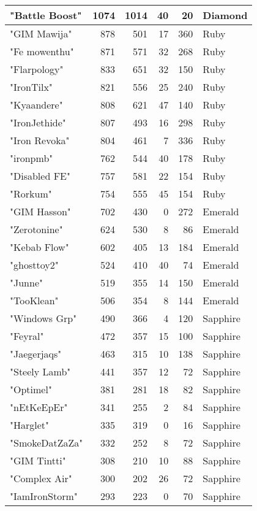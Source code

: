 \documentclass{article}
\begin{document}
\begin{table}[htbp]
\begin{tabular}{|l|r|r|r|r|l|}
"Battle Boost" & 1074 & 1014 & 40 & 20 & Diamond \\ \hline
"GIM Mawija" & 878 & 501 & 17 & 360 & Ruby \\ \hline
"Fe mowenthu" & 871 & 571 & 32 & 268 & Ruby \\ \hline
"Flarpology" & 833 & 651 & 32 & 150 & Ruby \\ \hline
"IronTilx" & 821 & 556 & 25 & 240 & Ruby \\ \hline
"Kyaandere" & 808 & 621 & 47 & 140 & Ruby \\ \hline
"IronJethide" & 807 & 493 & 16 & 298 & Ruby \\ \hline
"Iron Revoka" & 804 & 461 & 7 & 336 & Ruby \\ \hline
"ironpmb" & 762 & 544 & 40 & 178 & Ruby \\ \hline
"Disabled FE" & 757 & 581 & 22 & 154 & Ruby \\ \hline
"Rorkum" & 754 & 555 & 45 & 154 & Ruby \\ \hline
"GIM Hasson" & 702 & 430 & 0 & 272 & Emerald \\ \hline
"Zerotonine" & 624 & 530 & 8 & 86 & Emerald \\ \hline
"Kebab Flow" & 602 & 405 & 13 & 184 & Emerald \\ \hline
"ghosttoy2" & 524 & 410 & 40 & 74 & Emerald \\ \hline
"Junne" & 519 & 355 & 14 & 150 & Emerald \\ \hline
"TooKlean" & 506 & 354 & 8 & 144 & Emerald \\ \hline
"Windows Grp" & 490 & 366 & 4 & 120 & Sapphire \\ \hline
"Feyral" & 472 & 357 & 15 & 100 & Sapphire \\ \hline
"Jaegerjaqs" & 463 & 315 & 10 & 138 & Sapphire \\ \hline
"Steely Lamb" & 441 & 357 & 12 & 72 & Sapphire \\ \hline
"Optimel" & 381 & 281 & 18 & 82 & Sapphire \\ \hline
"nEtKeEpEr" & 341 & 255 & 2 & 84 & Sapphire \\ \hline
"Harglet" & 335 & 319 & 0 & 16 & Sapphire \\ \hline
"SmokeDatZaZa" & 332 & 252 & 8 & 72 & Sapphire \\ \hline
"GIM Tintti" & 308 & 210 & 10 & 88 & Sapphire \\ \hline
"Complex Air" & 300 & 202 & 26 & 72 & Sapphire \\ \hline
"IamIronStorm" & 293 & 223 & 0 & 70 & Sapphire \\ \hline

\end{tabular}
\end{table}
\end{document}
